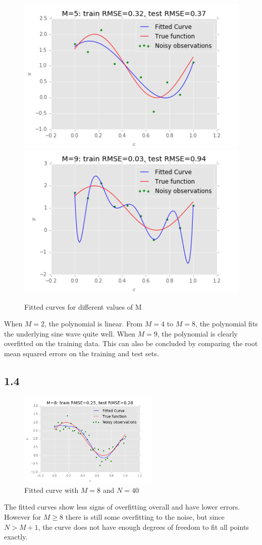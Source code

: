 \documentclass{article}
\begin{document}
\begin{figure}[H]
\includegraphics[width=.49\textwidth]{images/fit_m5_n_10.png}
\includegraphics[width=.49\textwidth]{images/fit_m9_n_10.png}
\caption{Fitted curves for different values of M}
\end{figure}
When $M=2$, the polynomial is linear. From $M=4$ to $M=8$, the polynomial fits the underlying sine wave quite well. When $M=9$, the polynomial is clearly overfitted on the training data. This can also be concluded by comparing the root mean squared errors on the training and test sets.
\subsection*{1.4}
\begin{figure}[H]
\centering
\includegraphics[width=0.6\textwidth]{images/fit_m8_n_40.png}
\caption{Fitted curve with $M=8$ and $N=40$}
\end{figure}
The fitted curves show less signs of overfitting overall and have lower errors. However for $M \geq 8$ there is still some overfitting to the noise, but since $N > M + 1$, the curve does not have enough degrees of freedom to fit all points exactly.
\end{document}
